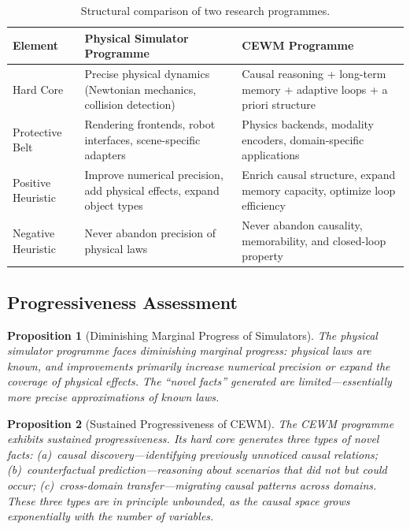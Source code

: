 \documentclass[11pt,a4paper]{article}
\newtheorem{proposition}{Proposition}[section]
\newcommand{\CEWM}{\textsc{CEWM}}
\begin{document}
\begin{table}[H]
\centering
\caption{Structural comparison of two research programmes.}\label{tab:programmes}
\small
\renewcommand{\arraystretch}{1.3}
\begin{tabularx}{\textwidth}{lXX}
\toprule
\textbf{Element} & \textbf{Physical Simulator Programme} & \textbf{\CEWM{} Programme} \\
\midrule
Hard Core & Precise physical dynamics (Newtonian mechanics, collision detection) & Causal reasoning + long-term memory + adaptive loops + a priori structure \\
Protective Belt & Rendering frontends, robot interfaces, scene-specific adapters & Physics backends, modality encoders, domain-specific applications \\
Positive Heuristic & Improve numerical precision, add physical effects, expand object types & Enrich causal structure, expand memory capacity, optimize loop efficiency \\
Negative Heuristic & Never abandon precision of physical laws & Never abandon causality, memorability, and closed-loop property \\
\bottomrule
\end{tabularx}
\end{table}

\subsection{Progressiveness Assessment}

\begin{proposition}[Diminishing Marginal Progress of Simulators]\label{prop:sim-decline}
The physical simulator programme faces diminishing marginal progress: physical laws are known, and improvements primarily increase numerical precision or expand the coverage of physical effects. The ``novel facts'' generated are limited---essentially more precise approximations of known laws.
\end{proposition}

\begin{proposition}[Sustained Progressiveness of \CEWM{}]\label{prop:cewm-progress}
The \CEWM{} programme exhibits sustained progressiveness. Its hard core generates three types of novel facts: (a)~causal discovery---identifying previously unnoticed causal relations; (b)~counterfactual prediction---reasoning about scenarios that did not but could occur; (c)~cross-domain transfer---migrating causal patterns across domains. These three types are in principle unbounded, as the causal space grows exponentially with the number of variables.
\end{proposition}
\end{document}
